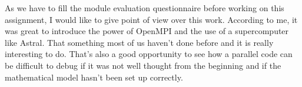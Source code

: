\documentclass[a4paper,11pt]{article}
\begin{document}
As we have to fill the module evaluation questionnaire before working on this assignment, I would like to give point of view over
this work. According to me, it was great to introduce the power of OpenMPI and the use of a supercomputer like Astral. That something
most of us haven't done before and it is really interesting to do. That's also a good opportunity to see how a parallel code can
be difficult to debug if it was not well thought from the beginning and if the mathematical model hasn't been set up correctly.
\end{document}
